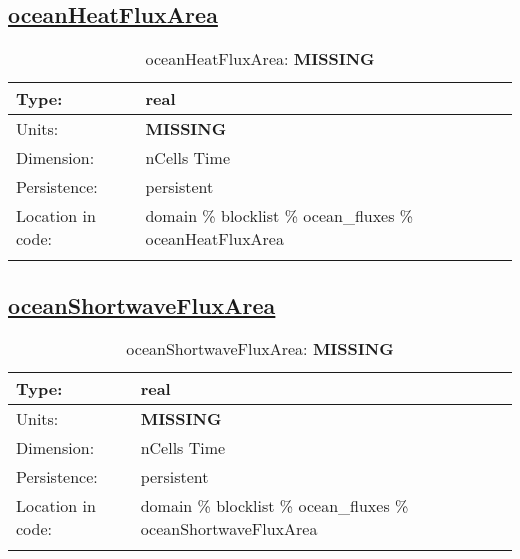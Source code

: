 \subsection[oceanHeatFluxArea]{\hyperref[sec:var_tab_ocean_fluxes]{oceanHeatFluxArea}}
\label{subsec:var_sec_ocean_fluxes_oceanHeatFluxArea}
\begin{center}
\begin{longtable}{| p{2.0in} | p{4.0in} |}
        \hline 
        Type: & real \\
        \hline 
        Units: & {\bf \color{red} MISSING} \\
        \hline 
        Dimension: & nCells Time \\
        \hline 
        Persistence: & persistent \\
        \hline 
         Location in code: & domain \% blocklist \% ocean\_fluxes \% oceanHeatFluxArea \\
         \hline 
    \caption{oceanHeatFluxArea: {\bf \color{red} MISSING}}
\end{longtable}
\end{center}
\subsection[oceanShortwaveFluxArea]{\hyperref[sec:var_tab_ocean_fluxes]{oceanShortwaveFluxArea}}
\label{subsec:var_sec_ocean_fluxes_oceanShortwaveFluxArea}
\begin{center}
\begin{longtable}{| p{2.0in} | p{4.0in} |}
        \hline 
        Type: & real \\
        \hline 
        Units: & {\bf \color{red} MISSING} \\
        \hline 
        Dimension: & nCells Time \\
        \hline 
        Persistence: & persistent \\
        \hline 
         Location in code: & domain \% blocklist \% ocean\_fluxes \% oceanShortwaveFluxArea \\
         \hline 
    \caption{oceanShortwaveFluxArea: {\bf \color{red} MISSING}}
\end{longtable}
\end{center}
